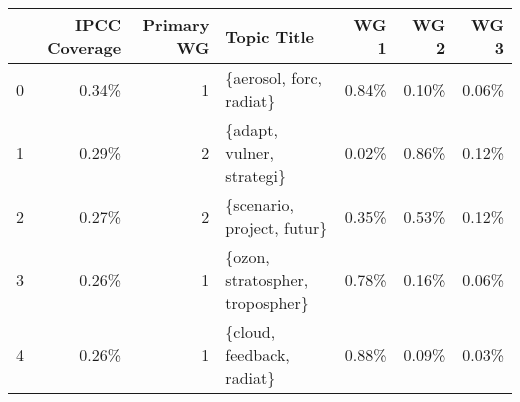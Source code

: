 \begin{tabular}{lrrlrrr}
\toprule
{} &  IPCC Coverage &  Primary WG &                      Topic Title &  WG 1 &  WG 2 &  WG 3 \\
\midrule
0 &          0.34\% &           1 &          \{aerosol, forc, radiat\} & 0.84\% & 0.10\% & 0.06\% \\
1 &          0.29\% &           2 &        \{adapt, vulner, strategi\} & 0.02\% & 0.86\% & 0.12\% \\
2 &          0.27\% &           2 &       \{scenario, project, futur\} & 0.35\% & 0.53\% & 0.12\% \\
3 &          0.26\% &           1 &  \{ozon, stratospher, tropospher\} & 0.78\% & 0.16\% & 0.06\% \\
4 &          0.26\% &           1 &        \{cloud, feedback, radiat\} & 0.88\% & 0.09\% & 0.03\% \\
\bottomrule
\end{tabular}
